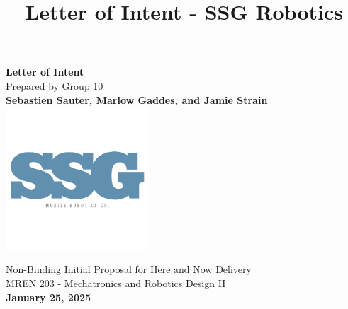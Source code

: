 \documentclass[letterpaper,fleqn,oneside]{template}
\begin{document}
\title{Letter of Intent - SSG Robotics}
\pagestyle{plain}


\begin{titlepage}
    \begin{center}
        \vspace*{1.2cm}  
        \Huge
        \textbf{Letter of Intent}\\
        
        \vspace{0.5cm}
        \large
        \vspace{2cm}
        Prepared by Group 10\\
        
        \vspace{0.8cm}
        \textbf{Sebastien Sauter, Marlow Gaddes, and Jamie Strain}\\ 
        
        \vspace{1.5cm} %
        \includegraphics[width=0.4\textwidth]{Deliverables/LOI/SSG_Robotics_Logo.png} %
        
        \vfill
        \small
        Non-Binding Initial Proposal for Here and Now Delivery\\
        
        \vspace{0.8cm}
        MREN 203 - Mechatronics and Robotics Design II\\
        
        \vspace{0.8cm}
        \textbf{January 25, 2025} 
    \end{center}
\end{titlepage}

\end{document}
